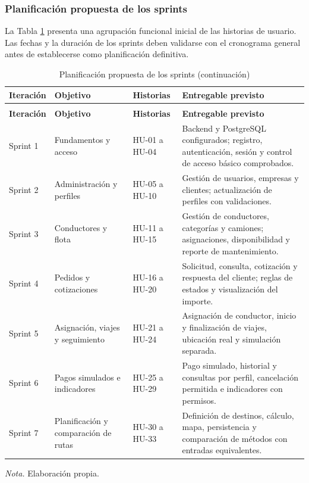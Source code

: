 \subsubsection{Planificación propuesta de los sprints}

La Tabla \ref{tab:sprints} presenta una agrupación funcional inicial de las historias de usuario. Las fechas y la duración de los sprints deben validarse con el cronograma general antes de establecerse como planificación definitiva.


\begingroup
	\small
	\setlength{\tabcolsep}{4.5pt}
	\renewcommand{\arraystretch}{1.45}
	\begin{longtable}{@{}>{\RaggedRight\arraybackslash}p{1.9cm}>{\RaggedRight\arraybackslash}p{3.45cm}>{\RaggedRight\arraybackslash}p{2.6cm}>{\RaggedRight\arraybackslash}p{7.45cm}@{}}
		\caption{Planificación propuesta de los sprints}\label{tab:sprints}\\
		\toprule
		\textbf{Iteración} & \textbf{Objetivo} & \textbf{Historias} & \textbf{Entregable previsto} \\
		\midrule
		\endfirsthead
		\caption[]{Planificación propuesta de los sprints (continuación)}\\
		\toprule
		\textbf{Iteración} & \textbf{Objetivo} & \textbf{Historias} & \textbf{Entregable previsto} \\
		\midrule
		\endhead
		\endfoot
		\bottomrule
		\endlastfoot
		Sprint 1 & Fundamentos y acceso & HU-01 a HU-04 & Backend y PostgreSQL configurados; registro, autenticación, sesión y control de acceso básico comprobados. \\ \midrule
		Sprint 2 & Administración y perfiles & HU-05 a HU-10 & Gestión de usuarios, empresas y clientes; actualización de perfiles con validaciones. \\ \midrule
		Sprint 3 & Conductores y flota & HU-11 a HU-15 & Gestión de conductores, categorías y camiones; asignaciones, disponibilidad y reporte de mantenimiento. \\ \midrule
		Sprint 4 & Pedidos y cotizaciones & HU-16 a HU-20 & Solicitud, consulta, cotización y respuesta del cliente; reglas de estados y visualización del importe. \\ \midrule
		Sprint 5 & Asignación, viajes y seguimiento & HU-21 a HU-24 & Asignación de conductor, inicio y finalización de viajes, ubicación real y simulación separada. \\ \midrule
		Sprint 6 & Pagos simulados e indicadores & HU-25 a HU-29 & Pago simulado, historial y consultas por perfil, cancelación permitida e indicadores con permisos. \\ \midrule
		Sprint 7 & Planificación y comparación de rutas & HU-30 a HU-33 & Definición de destinos, cálculo, mapa, persistencia y comparación de métodos con entradas equivalentes. \\ \midrule
	\end{longtable}
\endgroup
\textit{Nota.} Elaboración propia.


